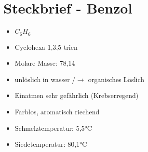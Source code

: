 \section{Steckbrief - Benzol}
\begin{itemize}
    \item $C_6H_6$
    \item Cyclohexa-1,3,5-trien
    \item Molare Masse: 78,14
    \item unlöslich in wasser /$\rightarrow$ organisches Löslich
    \item Einatmen sehr gefährlich (Krebserregend)
    \item Farblos, aromatisch riechend
    \item Schmelztemperatur: 5,5°C
    \item Siedetemperatur: 80,1°C
\end{itemize}
